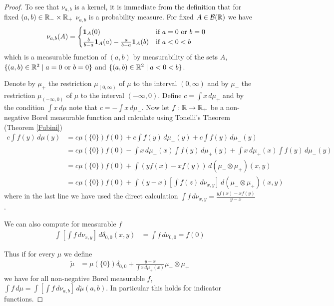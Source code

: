 \begin{proof}
To see that $\nu_{a,b}$ is a kernel, it is immediate from the
definition that for fixed $(a,b) \in \mathbb{R}_{-} \times \mathbb{R}_+$
$\nu_{a,b}$ is a probability measure.  For fixed $A \in
\mathcal{B}(\mathbb{R})$ we have
\begin{align*}
\nu_{a,b}(A) &= \begin{cases}
\textbf{1}_{A}(0) & \text{if $a=0$ or $b=0$} \\
\frac{b}{b-a} \textbf{1}_{A}(a) -
\frac{a}{b-a}\textbf{1}_{A}(b) & \text{if $a < 0 < b$}
\end{cases}
\end{align*}
which is a measurable function of $(a,b)$ by measurability of the sets
$A$, $\lbrace (a,b) \in \mathbb{R}^2 \mid a=0
\text { or } b=0\rbrace$ and $\lbrace (a,b) \in \mathbb{R}^2 \mid a < 0 <
b \rbrace$.

Denote by $\mu_+$  the restriction $\mu_{(0,
  \infty)}$ of $\mu$ to the interval $(0, \infty)$ and by  $\mu_-$  the
  restriction $\mu_{(-\infty,0)}$ of $\mu$ to the interval
    $(-\infty,0)$.
Define $c = \int x \, d\mu_+$ and by the condition $\int x \, d\mu$
note that $c = -\int x \, d\mu_-$. Now let $f : \mathbb{R} \to \mathbb{R}_+$
be a non-negative Borel measurable function and calculate using Tonelli's Theorem (Theorem \ref{Fubini})
\begin{align*}
c \int f(y) \, d\mu(y) &= c\mu(\lbrace 0 \rbrace) f(0) + c \int f(y) \, d\mu_+(y) + c \int f(y) \,
d\mu_-(y) \\
&= c\mu(\lbrace 0 \rbrace) f(0) -\int x \, d\mu_-(x) \int f(y) \, d\mu_+(y) + \int x \, d\mu_+(x)
\int f(y) \, d\mu_-(y) \\
&= c\mu(\lbrace 0 \rbrace) f(0)  + \int \left( yf(x) - xf(y) \right) \, d(\mu_{-} \otimes\mu_+ )(x,y) \\
&= c\mu(\lbrace 0 \rbrace) f(0) + \int \left( y-x \right)\left[ \int f(z) \, d\nu_{x,y} \right] \, d(\mu_{-} \otimes\mu_+ )(x,y)
\end{align*}
where in the last line we have used the direct calculation $\int f \, d\nu_{x,y} =
\frac{yf(x) - xf(y)}{y-x}$.

We can also compute for measurable $f$ 
\begin{align*}
\int \left [ \int f \, d\nu_{x,y} \right ]\, d\delta_{0,0}(x,y) 
&= \int f \, d\nu_{0,0} = f(0)
\end{align*}

Thus if for every $\mu$ we define 
\begin{align*}
\tilde{\mu} &= \mu(\lbrace 0 \rbrace)\delta_{0,0} + \frac{y-x}{\int x
  \, d\mu_+(x)} \mu_{-} \otimes \mu_{+}
\end{align*}
we have for all non-negative Borel measurable $f$, $\int f \, d\mu
= \int \left[ \int f \, d\nu_{a,b} \right ] \, d\tilde{\mu}(a,b)$.  In particular this holds for indicator functions.


\end{proof}
